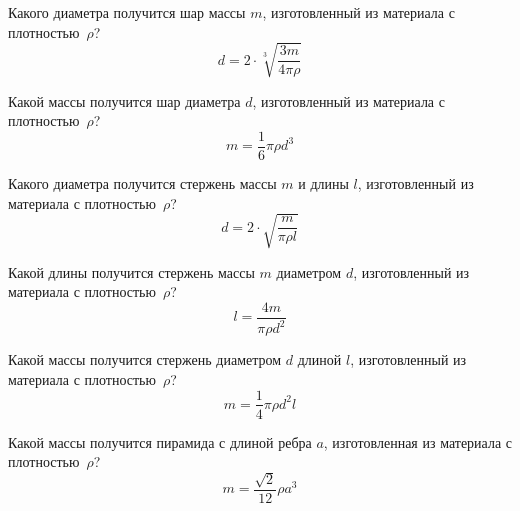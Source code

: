 \zzsectionVARIATIONS


\begin{zztask}
Какого диаметра получится шар массы $m$, изготовленный из материала с
плотностью~$\rho$?
%
\[
d = 2\cdot \sqrt[3]{\frac{3m}{4\pi\rho}}
\]
\end{zztask}


\begin{zztask}
Какой массы получится шар диаметра $d$, изготовленный из материала с
плотностью~$\rho$?
%
\[
m = \frac{1}{6}\pi\rho d^3
\]
\end{zztask}


\begin{zztask}
Какого диаметра получится стержень массы $m$ и длины $l$, изготовленный из
материала с плотностью~$\rho$?
%
\[
d = 2\cdot \sqrt{\frac{m}{\pi\rho l}}
\]
\end{zztask}


\begin{zztask}
Какой длины получится стержень массы $m$ диаметром $d$, изготовленный из
материала с плотностью~$\rho$?
%
\[
l = \frac{4m}{\pi\rho d^2}
\]
\end{zztask}


\begin{zztask}
Какой массы получится стержень диаметром $d$ длиной $l$, изготовленный из
материала с плотностью~$\rho$?
%
\[
m = \frac{1}{4}\pi\rho d^2 l
\]
\end{zztask}


\begin{zztask}
Какой массы получится пирамида с длиной ребра $a$, изготовленная из
материала с плотностью~$\rho$?
%
\[
m = \frac{\sqrt2}{12}\rho a^3
\]
\end{zztask}


